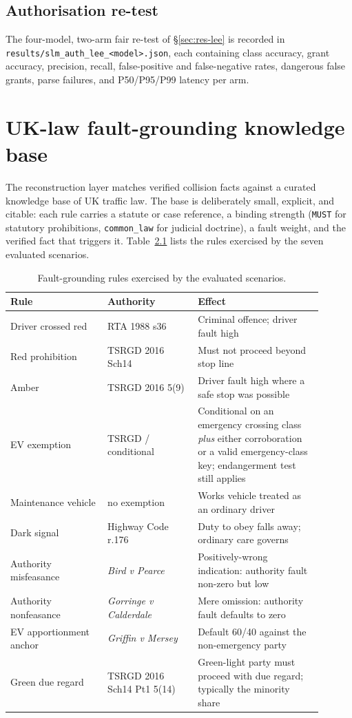 \section{Authorisation re-test}
The four-model, two-arm fair re-test of \S\ref{sec:res-lee} is recorded in
\texttt{results/slm\_auth\_lee\_<model>.json}, each containing class
accuracy, grant accuracy, precision, recall, false-positive and
false-negative rates, dangerous false grants, parse failures, and
P50/P95/P99 latency per arm.

\chapter{UK-law fault-grounding knowledge base}\label{app:uklaw}

The reconstruction layer matches verified collision facts against a
curated knowledge base of UK traffic law. The base is deliberately small,
explicit, and citable: each rule carries a statute or case reference, a
binding strength (\texttt{MUST} for statutory prohibitions,
\texttt{common\_law} for judicial doctrine), a fault weight, and the
verified fact that triggers it. Table~\ref{tab:uklaw} lists the rules
exercised by the seven evaluated scenarios.

\begin{table}[h]
\caption{Fault-grounding rules exercised by the evaluated scenarios.}
\label{tab:uklaw}
\centering
\small
\begin{tabular}{p{0.28\linewidth}p{0.26\linewidth}p{0.36\linewidth}}
\toprule
Rule & Authority & Effect \\
\midrule
Driver crossed red & RTA 1988 s36 & Criminal offence; driver fault high \\
Red prohibition & TSRGD 2016 Sch14 & Must not proceed beyond stop line \\
Amber & TSRGD 2016 5(9) & Driver fault high where a safe stop was possible \\
EV exemption & TSRGD / conditional & Conditional on an emergency crossing
class \emph{plus} either corroboration or a valid emergency-class key;
endangerment test still applies \\
Maintenance vehicle & no exemption & Works vehicle treated as an ordinary driver \\
Dark signal & Highway Code r.176 & Duty to obey falls away; ordinary care governs \\
Authority misfeasance & \emph{Bird v Pearce} & Positively-wrong indication:
authority fault non-zero but low \\
Authority nonfeasance & \emph{Gorringe v Calderdale} & Mere omission: authority
fault defaults to zero \\
EV apportionment anchor & \emph{Griffin v Mersey} & Default 60/40 against the
non-emergency party \\
Green due regard & TSRGD 2016 Sch14 Pt1 5(14) & Green-light party must proceed
with due regard; typically the minority share \\
\bottomrule
\end{tabular}
\end{table}

